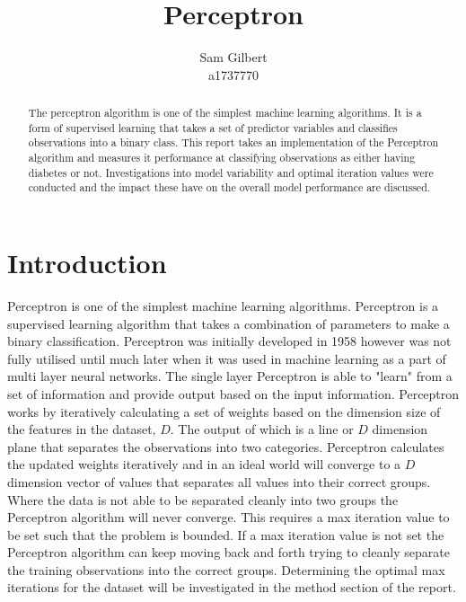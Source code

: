 \documentclass[10pt,twocolumn,letterpaper]{article}
\begin{document}
\title{Perceptron}

\author{Sam Gilbert\\
   a1737770\\}
\maketitle

\begin{abstract}
   The perceptron algorithm is one of the simplest machine learning algorithms. It is a
   form of supervised learning that takes a set of predictor variables and classifies observations
   into a binary class. This report takes an implementation of the Perceptron algorithm and measures
   it performance at classifying observations as either having diabetes or not. Investigations into
   model variability and optimal iteration values were conducted and the impact these have on the
   overall model performance are discussed.
\end{abstract}

\section{Introduction}

Perceptron is one of the simplest machine learning algorithms. Perceptron is a supervised learning
algorithm that takes a combination of parameters to make a binary classification. Perceptron was initially
developed in 1958 \cite{cornellProfessorsPerceptron} however was not fully utilised until much later
when it was used in machine learning as a part of multi layer neural networks. The single layer
Perceptron is able to "learn" from a set of information and provide output based on the input information.
Perceptron works by iteratively calculating a set of weights based on the dimension size
of the features in the dataset, $D$. The output of which is a line or $D$ dimension plane
that separates the observations into two categories. Perceptron calculates the updated
weights iteratively and in an ideal world will converge to a $D$ dimension vector of values
that separates all values into their correct groups. Where the data is not able to be
separated cleanly into two groups the Perceptron algorithm will never converge. This requires
a max iteration value to be set such that the problem is bounded. If a max iteration value
is not set the Perceptron algorithm can keep moving back and forth trying to cleanly separate
the training observations into the correct groups. Determining the optimal max iterations
for the dataset will be investigated in the method section of the report.
\end{document}
